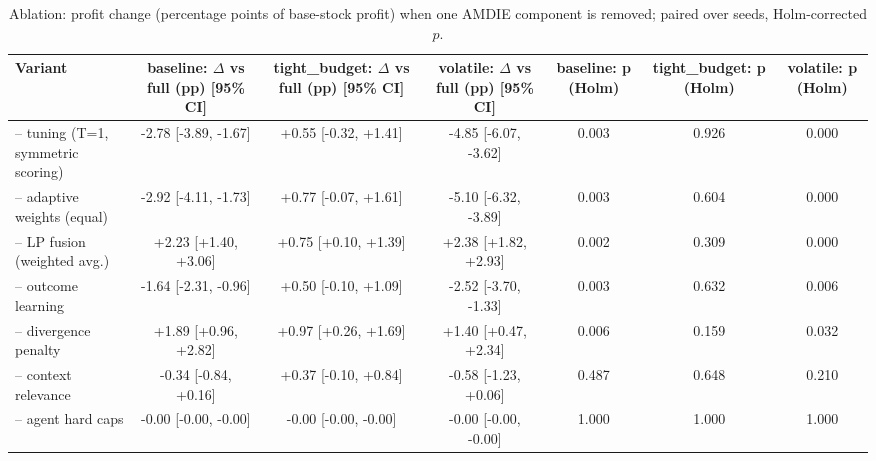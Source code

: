 \begin{table}[t]
\centering\small
\caption{Ablation: profit change (percentage points of base-stock profit) when one AMDIE component is removed; paired over seeds, Holm-corrected $p$.}\label{tab:ablation}
\begin{tabular}{lcccccc}
\toprule
Variant & baseline: $\Delta$ vs full (pp) [95\% CI] & tight_budget: $\Delta$ vs full (pp) [95\% CI] & volatile: $\Delta$ vs full (pp) [95\% CI] & baseline: p (Holm) & tight_budget: p (Holm) & volatile: p (Holm) \\
\midrule
-- tuning (T=1, symmetric scoring) & -2.78 [-3.89, -1.67] & +0.55 [-0.32, +1.41] & -4.85 [-6.07, -3.62] & 0.003 & 0.926 & 0.000 \\
-- adaptive weights (equal) & -2.92 [-4.11, -1.73] & +0.77 [-0.07, +1.61] & -5.10 [-6.32, -3.89] & 0.003 & 0.604 & 0.000 \\
-- LP fusion (weighted avg.) & +2.23 [+1.40, +3.06] & +0.75 [+0.10, +1.39] & +2.38 [+1.82, +2.93] & 0.002 & 0.309 & 0.000 \\
-- outcome learning & -1.64 [-2.31, -0.96] & +0.50 [-0.10, +1.09] & -2.52 [-3.70, -1.33] & 0.003 & 0.632 & 0.006 \\
-- divergence penalty & +1.89 [+0.96, +2.82] & +0.97 [+0.26, +1.69] & +1.40 [+0.47, +2.34] & 0.006 & 0.159 & 0.032 \\
-- context relevance & -0.34 [-0.84, +0.16] & +0.37 [-0.10, +0.84] & -0.58 [-1.23, +0.06] & 0.487 & 0.648 & 0.210 \\
-- agent hard caps & -0.00 [-0.00, -0.00] & -0.00 [-0.00, -0.00] & -0.00 [-0.00, -0.00] & 1.000 & 1.000 & 1.000 \\
\bottomrule
\end{tabular}
\end{table}
